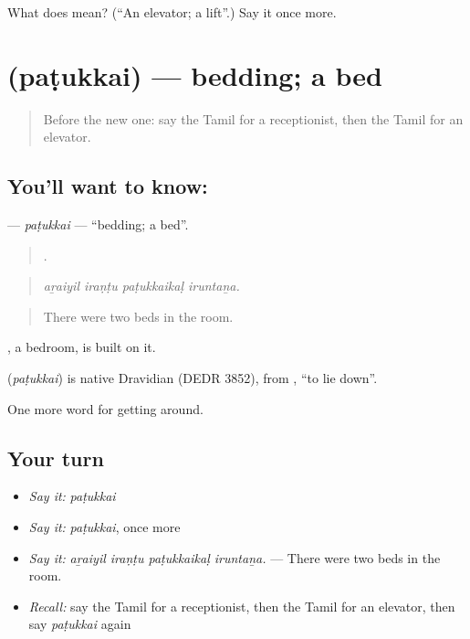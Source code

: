 \begin{tcolorbox}[breakable,colback=teal!4,colframe=teal!35!black,title={Before you move on}]
What does  mean? (\textquotedblleft{}An elevator; a lift\textquotedblright{}.) Say it once more.
\end{tcolorbox}
\section[\texorpdfstring{\ta{படுக்கை} (paṭukkai)}{படுக்கை (paṭukkai)}]{ (paṭukkai) — bedding; a bed}

\label{lesson:TA-C418-patukkai}



\begin{quote}
Before the new one: say the Tamil for a receptionist, then the Tamil for an elevator.
\end{quote}

\subsection*{You'll want to know: }
\textbf{} — \emph{paṭukkai} — \textquotedblleft{}bedding; a bed\textquotedblright{}.

\begin{quote}
   .
\end{quote}

\begin{quote}
\emph{aṟaiyil iraṇṭu paṭukkaikaḷ iruntaṉa.}
\end{quote}

\begin{quote}
There were two beds in the room.
\end{quote}

, a bedroom, is built on it.

\begin{cousinweb}
\textbf{} (\emph{paṭukkai}) is native Dravidian (DEDR 3852), from , \textquotedblleft{}to lie down\textquotedblright{}.
\end{cousinweb}

\begin{grammarlens}[title={What you've built}]
One more word for getting around.
\end{grammarlens}

\subsection*{Your turn}
\begin{itemize}
\raggedright
  \item \emph{Say it:} \emph{paṭukkai}
  \item \emph{Say it:} \emph{paṭukkai}, once more
  \item \emph{Say it:} \emph{aṟaiyil iraṇṭu paṭukkaikaḷ iruntaṉa.} — There were two beds in the room.
  \item \emph{Recall:} say the Tamil for a receptionist, then the Tamil for an elevator, then say \emph{paṭukkai} again
\end{itemize}

